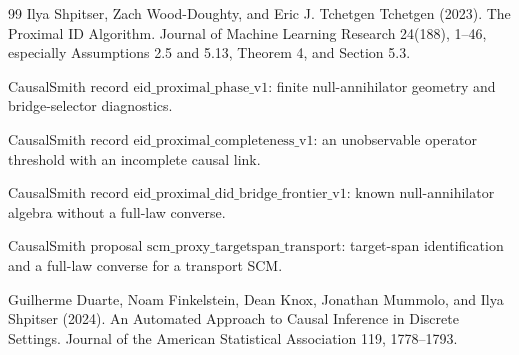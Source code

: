\documentclass{article}
\begin{document}
\begin{thebibliography}{99}
   Ilya Shpitser, Zach Wood-Doughty, and Eric J. Tchetgen Tchetgen (2023). The Proximal ID Algorithm. Journal of Machine Learning Research 24(188), 1--46, especially Assumptions 2.5 and 5.13, Theorem 4, and Section 5.3.

   CausalSmith record \(\mathrm{eid\_proximal\_phase\_v1}\): finite null-annihilator geometry and bridge-selector diagnostics.

   CausalSmith record \(\mathrm{eid\_proximal\_completeness\_v1}\): an unobservable operator threshold with an incomplete causal link.

   CausalSmith record \(\mathrm{eid\_proximal\_did\_bridge\_frontier\_v1}\): known null-annihilator algebra without a full-law converse.

   CausalSmith proposal \(\mathrm{scm\_proxy\_targetspan\_transport}\): target-span identification and a full-law converse for a transport SCM.

   Guilherme Duarte, Noam Finkelstein, Dean Knox, Jonathan Mummolo, and Ilya Shpitser (2024). An Automated Approach to Causal Inference in Discrete Settings. Journal of the American Statistical Association 119, 1778--1793.

\end{thebibliography}
\end{document}
